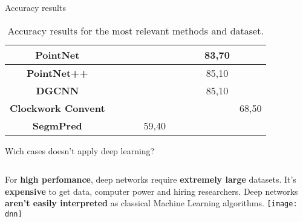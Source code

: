 \begin{frame}[t]{Accuracy results }
\begin{table}[]
\begin{tabular}{|c|c|c|c|c|c|c|c|c|c|}
                \textbf{PointNet}          &      &       &       &       &       &  &       & 83,70 &       \\ \hline
                \textbf{PointNet++}        &      &       &       &       &       &  &       & 85,10 &       \\ \hline
                \textbf{DGCNN}             &      &       &       &       &       &  &       & 85,10 &       \\ \hline
                \textbf{Clockwork Convent} &      &       &       &       &       &  &       &       & 68,50 \\ \hline
                \textbf{SegmPred}          &      &       &       & 59,40 &       &  &       &       &       \\ \hline
                \end{tabular}
                \caption{Accuracy results for the most relevant methods and dataset. \cite{garcia2018survey}}
                \label{tab:accuracy_results}
                \end{table}
\end{frame}

\begin{frame}[t]{Wich cases doesn't apply deep learning?} %
        \begin{columns}[c]
                        For \textbf{high perfomance}, deep networks require \textbf{extremely large} datasets.  
                        \newline
                        \newline
                        It's \textbf{expensive} to get data, computer power and hiring researchers.
                        \newline
                        \newline
                        Deep networks \textbf{aren't easily interpreted} as classical Machine Learning algorithms.
                    \texttt{[image: dnn]}
            \end{columns}
        
    
\end{frame}

